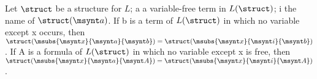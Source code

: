 \begin{lemma}
	Let $\struct$ be a structure for $L$; \synt a a variable-free term in
	$L(\struct)$; \synt i the name of $\struct(\msynt a)$. If \synt b is a term 
	of $L(\struct)$ in which no variable except \synt x occurs, then
	$\struct(\msubs{\msynt x}{\msynt a}{\msynt b}) = \struct(\msubs{\msynt x}{\msynt i}{\msynt b})$.
	If \synt A is a formula of $L(\struct)$ in which no variable except \synt x
	is free, then
	$\struct(\msubs{\msynt x}{\msynt a}{\msynt A}) = \struct(\msubs{\msynt x}{\msynt i}{\msynt A})$.
\end{lemma}